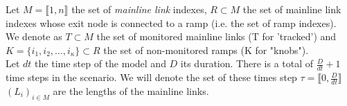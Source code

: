 Let $M=\llbracket 1,n \rrbracket$ the set of \emph{mainline link} indexes, $R\subset{M}$ the set of mainline link indexes whose exit node is connected to a ramp (i.e. the set of ramp indexes). \\
We denote as $T\subset{M}$ the set of monitored mainline links  (T for 'tracked') and $K=\{ i_{1},i_{2},...,i_{\kappa}\}\subset{R}$ the set of non-monitored ramps (K for "knobs").\\
Let $dt$ the time step of the model and $D$ its duration. There is a total of $\frac{D}{dt}+1$ time steps in the scenario. We will denote the set of these times step $\tau=\llbracket 0,\frac{D}{dt}\rrbracket $\\
$(L_{i})_{i\in M}$ are the lengths of the mainline links.\\
